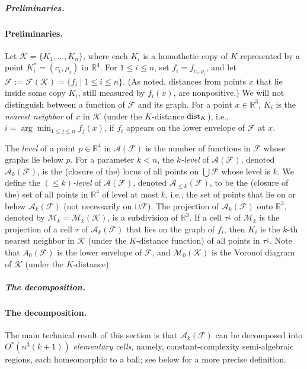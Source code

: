 \documentclass[11pt]{article}
\def\reals{{\mathbb R}}
\def\dist{{\rm dist}}
\def\A{\mathcal{A}}
\def\F{\mathcal{F}}
\def\K{\mathcal{K}}
\def\M{\mathcal{M}}
\def\cell{\tau}
\def\marrow{\marginpar[\hfill$\longrightarrow$]{$\longleftarrow$}}
\def\micha#1{{\color{magenta} \textsc{(Micha says: }\marrow\textsf{#1})}}
\def\pankaj#1{{\color{blue} \textsc{(Pankaj says: }\marrow\textsf{#1})}}
\theoremstyle{definition}
\begin{document}
\ifsocgproc 
\subparagraph*{Preliminaries.}
\else
\paragraph{Preliminaries.}
\fi
Let $\K = \{K_1, \ldots, K_n\}$, where each $K_i$ 
is a homothetic copy of $K$ represented by a point $K_i^* = (c_i,\rho_i)$ in $\reals^4$.
For $1 \le i \le n$, set $f_i = f_{c_i,\rho_i}$, and let 
$\F := \F(\K) = \{ f_i \mid 1 \le i \le n\}$.
(As noted, distances from points $x$ that lie inside some copy $K_i$, still measured by $f_i(x)$, are nonpositive.)
We will not distinguish between a function of $\F$ and its graph.
For a point $x\in\reals^3$, $K_i$ is the \emph{nearest neighbor} of $x$ in $\K$ 
(under the $K$-distance $\dist_K$), i.e., $i = \arg\min_{1 \le j \le n} f_j(x)$, if
$f_i$ appears on the lower envelope of $\F$ at $x$. 

The \emph{level} of a point $p\in\reals^4$ in $\A(\F)$ is the number of functions in $\F$ whose graphs lie below $p$.
For a parameter $k < n$, the \emph{$k$-level} of $\A(\F)$, denoted $\A_k(\F)$, is the 
(closure of the) locus of all points on $\bigcup \F$ whose level is $k$.
We define the \emph{$(\le k)$-level} of $\A(\F)$, denoted $\A_{\le k}(\F)$, to be 
the (closure of the) set of all points in $\reals^4$ of level at most $k$, i.e., 
the set of points that lie on or below $\A_k(\F)$ (not necessarily on $\cup\F$).
The projection of $\A_k(\F)$ onto $\reals^3$, 
denoted by $\M_k = \M_k (\K)$, is a subdivision of $\reals^3$. 
If a cell $\cell^\downarrow$ of $\M_k$ is the projection of a cell $\cell$ of 
$\A_k(\F)$ that lies on the graph of $f_i$, 
then $K_i$ is the $k$-th nearest neighbor in $\K$ (under the $K$-distance function)
of all points in $\cell^\downarrow$. Note that $A_0(\F)$ is the lower envelope of $\F$, 
and $\M_0(\K)$ is the Voronoi diagram of $\K$ (under the $K$-distance).

\ifsocgproc 
\subparagraph*{The decomposition.}
\else
\paragraph{The decomposition.}
\fi
The main technical result of this section is that $\A_k(\F)$ can be decomposed into 
$O^*(n^3(k+1))$ \emph{elementary cells}, namely, constant-complexity semi-algebraic regions, 
each homeomorphic to a ball; see below for a more precise definition.
\end{document}
